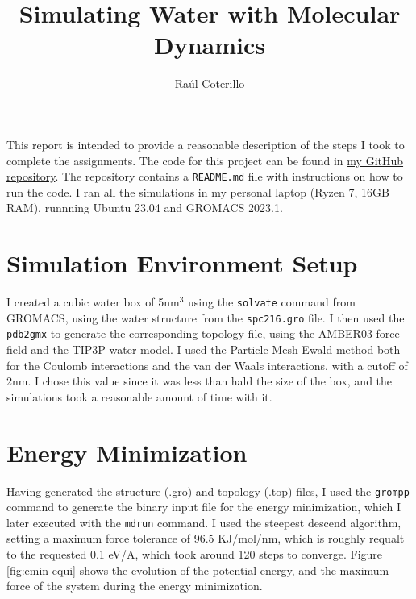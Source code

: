 \documentclass[a4paper,11pt]{article}
\title{Simulating Water with Molecular Dynamics}
\author{Raúl Coterillo}
\begin{document}
\maketitle

This report is intended to provide a reasonable description of the steps I took to complete the assignments. The code for this project can be found in \href{https://github.com/rcote98/small-submission}{my GitHub repository}. The repository contains a \texttt{README.md} file with instructions on how to run the code. I ran all the simulations in my personal laptop (Ryzen 7, 16GB RAM), runnning Ubuntu 23.04 and GROMACS 2023.1.

\section{Simulation Environment Setup}

I created a cubic water box of 5nm$^3$ using the \texttt{solvate} command from GROMACS, using the water structure from the \texttt{spc216.gro} file. I then used the \texttt{pdb2gmx} to generate the corresponding topology file, using the AMBER03 force field and the TIP3P water model. I used the Particle Mesh Ewald method both for the Coulomb interactions and the van der Waals interactions, with a cutoff of 2nm. I chose this value since it was less than hald the size of the box, and the simulations took a reasonable amount of time with it.

\section{Energy Minimization}

Having generated the structure (.gro) and topology (.top) files, I used the \texttt{grompp} command to generate the binary input file for the energy minimization, which I later executed with the \texttt{mdrun} command. I used the steepest descend algorithm, setting a maximum force tolerance of 96.5 KJ/mol/nm, which is roughly requalt to the requested 0.1 eV/A, which took around 120 steps to converge. Figure \ref{fig:emin-equi} shows the evolution of the potential energy, and the maximum force of the system during the energy minimization.
\end{document}
